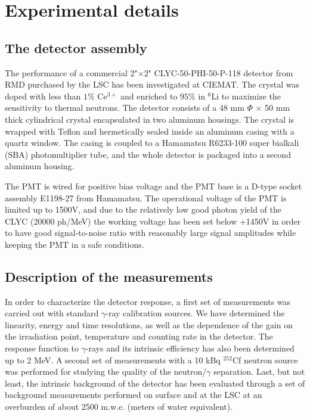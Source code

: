 \documentclass[review,number,sort&compress]{elsarticle}
\begin{document}
\section{Experimental details}

\subsection{The detector assembly}

The performance of a commercial 2"$\times$2" CLYC-50-PHI-50-P-118 detector from RMD purchased by the LSC has been investigated at CIEMAT. The crystal was doped with less than $1\%$ Ce$^{3+}$ and enriched to $95\%$ in $^{6}$Li to maximize the sensitivity to thermal neutrons. The detector consists of a 48 mm $\Phi$ $\times$ 50 mm thick cylindrical crystal encapsulated in two aluminum housings. The crystal is wrapped with Teflon and hermetically sealed inside an aluminum casing with a quartz window. The casing is coupled to a Hamamatsu R6233-100 super bialkali (SBA) photomultiplier tube, and the whole detector is packaged into a second aluminum housing. 

The PMT is wired for positive bias voltage and the PMT base is a D-type socket assembly E1198-27 from Hamamatsu. The operational voltage of the PMT is limited up to 1500V, and due to the relatively low good photon yield of the CLYC (20000 ph/MeV) the working voltage has been set below +1450V in order to have good signal-to-noise ratio with reasonably large signal amplitudes while keeping the PMT in a safe conditions.   

\subsection{Description of the measurements}

In order to characterize the detector response, a first set of measurements was carried out with standard $\gamma$-ray calibration sources. We have determined the linearity, energy and time resolutions, as well as the dependence of the gain on the irradiation point, temperature and counting rate in the detector. The response function to $\gamma$-rays and its intrinsic efficiency has also been determined up to 2 MeV. A second set of measurements with a 10 kBq $^{252}$Cf neutron source was performed for studying the quality of the neutron/$\gamma$ separation. Last, but not least, the intrinsic background of the detector has been evaluated through a set of background measurements performed on surface and at the LSC at an overburden of about 2500 m.w.e. (meters of water equivalent).
\end{document}
